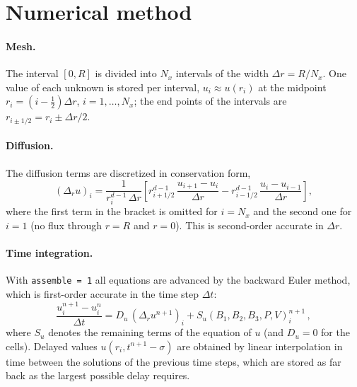 \documentclass[11pt]{article}
\newcommand{\code}[1]{\texttt{#1}}
\newcommand{\Dr}{\Delta r}
\newcommand{\Dt}{\Delta t}
\begin{document}
\section{Numerical method}
\label{sec:num}
\paragraph{Mesh.}
The interval $[0,R]$ is divided into $N_x$ intervals of the width $\Dr=R/N_x$.
One value of each unknown is stored per interval, $u_i\approx u(r_i)$ at the midpoint $r_i=(i-\frac12)\Dr$, $i=1,\dots,N_x$; the end points of the intervals are $r_{i\pm1/2}=r_i\pm\Dr/2$.

\paragraph{Diffusion.}
The diffusion terms are discretized in conservation form,
\begin{equation*}
  (\Delta_ru)_i = \frac{1}{r_i^{d-1}\,\Dr}\left[r_{i+1/2}^{d-1}\,\frac{u_{i+1}-u_i}{\Dr} - r_{i-1/2}^{d-1}\,\frac{u_i-u_{i-1}}{\Dr}\right],
\end{equation*}
where the first term in the bracket is omitted for $i=N_x$ and the second one for $i=1$ (no flux through $r=R$ and $r=0$).
This is second-order accurate in $\Dr$.

\paragraph{Time integration.}
With \code{assemble = 1} all equations are advanced by the backward Euler method, which is first-order accurate in the time step $\Dt$:
\begin{equation*}
  \frac{u_i^{n+1}-u_i^n}{\Dt} = D_u\,(\Delta_ru^{n+1})_i + S_u(B_1,B_2,B_3,P,V)_i^{n+1}\,,
\end{equation*}
where $S_u$ denotes the remaining terms of the equation of $u$ (and $D_u=0$ for the cells).
Delayed values $u(r_i,t^{n+1}-\sigma)$ are obtained by linear interpolation in time between the solutions of the previous time steps, which are stored as far back as the largest possible delay requires.
\end{document}
